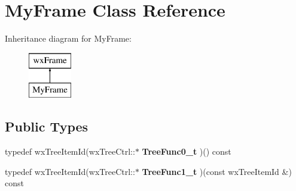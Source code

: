 \hypertarget{class_my_frame}{\section{My\+Frame Class Reference}
\label{class_my_frame}
}
Inheritance diagram for My\+Frame\+:\begin{figure}[H]
\begin{center}
\leavevmode
\includegraphics[height=2.000000cm]{class_my_frame}
\end{center}
\end{figure}
\subsection*{Public Types}
\begin{DoxyCompactItemize}
\item 
\hypertarget{class_my_frame_aa3aa7ed18d345c10376374ce7e5ec703}{typedef wx\+Tree\+Item\+Id(wx\+Tree\+Ctrl\+::$\ast$ {\bfseries Tree\+Func0\+\_\+t} )() const }\label{class_my_frame_aa3aa7ed18d345c10376374ce7e5ec703}

\item 
\hypertarget{class_my_frame_a49114c539b71c6f4c18d7a4858b5b171}{typedef wx\+Tree\+Item\+Id(wx\+Tree\+Ctrl\+::$\ast$ {\bfseries Tree\+Func1\+\_\+t} )(const wx\+Tree\+Item\+Id \&) const }\label{class_my_frame_a49114c539b71c6f4c18d7a4858b5b171}

\end{DoxyCompactItemize}
